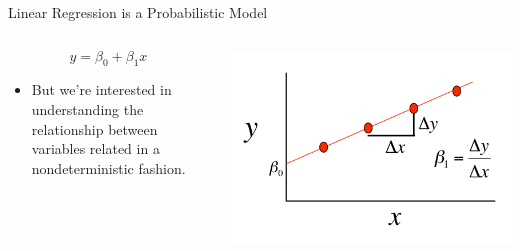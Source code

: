 \documentclass[australian,ignorenonframetext,aspectratio=169]{beamer}
\providecommand{\tightlist}{%
  \setlength{\itemsep}{0pt}\setlength{\parskip}{0pt}}
\begin{document}
\begin{frame}{Linear Regression is a Probabilistic Model}
\protect\hypertarget{linear-regression-is-a-probabilistic-model}{}

\begin{columns}[T]
\begin{column}{0.5\textwidth}

\[y = \beta_0 + \beta_1x\]

\begin{itemize}
\tightlist
\item
  But we're interested in understanding the relationship between
  variables related in a nondeterministic fashion.
\end{itemize}
\end{column}

\begin{column}{0.5\textwidth}
\begin{center}\includegraphics[width=1\linewidth]{../graphs/ari} \end{center}
\end{column}
\end{columns}

\end{frame}
\end{document}
